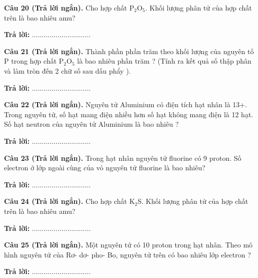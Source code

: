 \documentclass{article}
\begin{document}
\newpage

\fontsize{30}{40}\selectfont
\textbf{Câu 20 (Trả lời ngắn).} Cho hợp chất P$_{2}$O$_{5}$. Khối lượng phân tử của hợp chất trên là bao nhiêu amu?
\vspace{22pt}

\textbf{Trả lời:} $\dots\dots\dots\dots\dots\dots\dots\dots\dots\dots$

\newpage

\fontsize{30}{40}\selectfont
\textbf{Câu 21 (Trả lời ngắn).} Thành phần phần trăm theo khối lượng của nguyên tố P trong hợp chất P$_{2}$O$_{5}$ là bao nhiêu phần trăm ? (Tính ra kết quả số thập phân và làm tròn đến 2 chữ số sau dấu phẩy ).
\vspace{22pt}

\textbf{Trả lời:} $\dots\dots\dots\dots\dots\dots\dots\dots\dots\dots$

\newpage

\fontsize{30}{40}\selectfont
\textbf{Câu 22 (Trả lời ngắn).} Nguyên tử Aluminium có điện tích hạt nhân là 13+. Trong nguyên tử, số hạt mang điện nhiều hơn số hạt không mang điện là 12 hạt. Số hạt neutron của nguyên tử Aluminium là bao nhiêu ?
\vspace{22pt}

\textbf{Trả lời:} $\dots\dots\dots\dots\dots\dots\dots\dots\dots\dots$

\newpage

\fontsize{30}{40}\selectfont
\textbf{Câu 23 (Trả lời ngắn).} Trong hạt nhân nguyên tử fluorine có 9 proton. Số electron ở lớp ngoài cùng của vỏ nguyên tử fluorine là bao nhiêu?
\vspace{22pt}

\textbf{Trả lời:} $\dots\dots\dots\dots\dots\dots\dots\dots\dots\dots$

\newpage

\fontsize{30}{40}\selectfont
\textbf{Câu 24 (Trả lời ngắn).} Cho hợp chất K$_{2}$S. Khối lượng phân tử của hợp chất trên là bao nhiêu amu?
\vspace{22pt}

\textbf{Trả lời:} $\dots\dots\dots\dots\dots\dots\dots\dots\dots\dots$

\newpage

\fontsize{30}{40}\selectfont
\textbf{Câu 25 (Trả lời ngắn).} Một nguyên tử có 10 proton trong hạt nhân. Theo mô hình nguyên tử của Rơ- dơ- pho- Bo, nguyên tử trên có bao nhiêu lớp electron ?
\vspace{22pt}

\textbf{Trả lời:} $\dots\dots\dots\dots\dots\dots\dots\dots\dots\dots$
\end{document}
